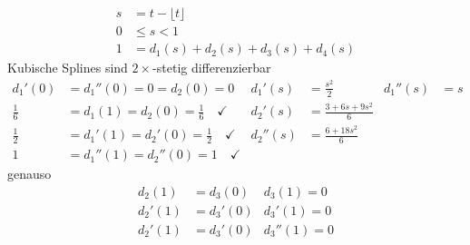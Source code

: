 \begin{align*}
 s &= t - \lfloor t \rfloor\\
 0 &\le s < 1\\
 1 &= d_1(s) + d_2(s) + d_3(s) + d_4(s)
\end{align*}
\Satz Kubische Splines sind $2 \times$-stetig differenzierbar
\begin{align*}
 d_1'(0) &= d_1''(0) = 0 = d_2(0) = 0 & d_1'(s) &= \frac{s^2}{2} & d_1''(s) &= s\\
 \frac{1}{6} &= d_1(1) = d_2(0) = \frac{1}{6} \quad \checkmark	& d_2'(s) &= \frac{3 + 6s +9s^2}{6}\\
 \frac{1}{2} &= d_1'(1) = d_2'(0) = \frac{1}{2} \quad \checkmark	& d_2''(s) &= \frac{6 + 18s^2}{6}\\
 1 &= d_1''(1) = d_2''(0) = 1 \quad \checkmark
\end{align*}
genauso
\begin{align*}
 d_2(1) &= d_3(0) & d_3(1) = 0\\
 d_2'(1) &= d_3'(0) & d_3'(1) = 0\\
 d_2'(1) &= d_3'(0) & d_3''(1) = 0\\
\end{align*}

